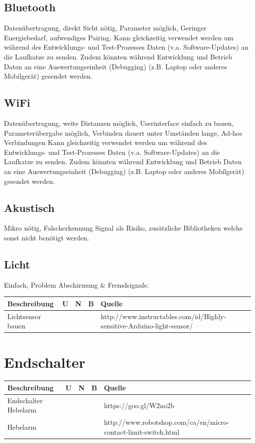 \documentclass[a4paper]{report}
\begin{document}
\subsection{Bluetooth}
Datenübertragung, direkt Sicht nötig, Parameter möglich, Geringer Energiebedarf, aufwendiges Pairing.
Kann gleichzeitig verwendet werden um während des Entwicklungs- und Test-Prozesses Daten (v.a. Software-Updates) an die Laufkatze zu senden. Zudem könnten während Entwicklung und Betrieb Daten an eine Auswertungseinheit (Debugging) (z.B. Laptop oder anderes Mobilgerät) gesendet werden.

\subsection{WiFi}
Datenübertragung, weite Distanzen möglich, Userinterface einfach zu bauen, Parameterübergabe möglich, Verbinden dauert unter Umständen lange, Ad-hoc Verbindungen
Kann gleichzeitig verwendet werden um während des Entwicklungs- und Test-Prozesses Daten (v.a. Software-Updates) an die Laufkatze zu senden. Zudem könnten während Entwicklung und Betrieb Daten an eine Auswertungseinheit (Debugging) (z.B. Laptop oder anderes Mobilgerät) gesendet werden.

\subsection{Akustisch}
Mikro nötig, Falscherkennung Signal als Risiko, zusätzliche Bibliotheken welche sonst nicht benötigt werden.

\subsection{Licht}
Einfach, Problem Abschirmung \& Fremdsignale.

\vspace{1em}
\noindent
\begin{tabular}{|p{}|p{}|p{}|p{}|p{}|}
	\hline
	\textbf{Beschreibung} & \textbf{U} & \textbf{N} & \textbf{B} & \textbf{Quelle} \\
	\hline
	Lichtsensor bauen & & & & http://www.instructables.com/id/Highly-sensitive-Arduino-light-sensor/ \\
	\hline
\end{tabular}


\section{Endschalter}
\begin{tabular}{|p{}|p{}|p{}|p{}|p{}|}
	\hline
	\textbf{Beschreibung} & \textbf{U} & \textbf{N} & \textbf{B} & \textbf{Quelle} \\
	\hline
	Endschalter Hebelarm & & & & https://goo.gl/W2no2b\\
	\hline
	Hebelarm & & & & http://www.robotshop.com/ca/en/micro-contact-limit-switch.html\\
	\hline
\end{tabular}
\end{document}
